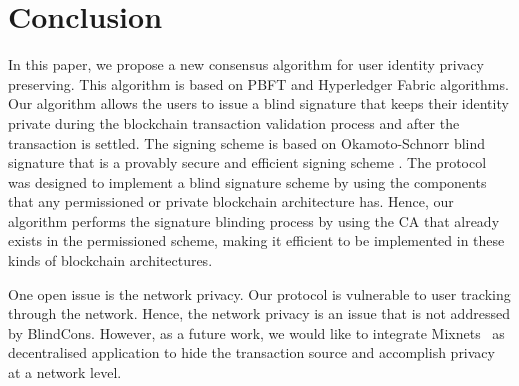 \documentclass[conference]{IEEEtran}
\newcommand{\name}{BlindCons}
\begin{document}
\section{Conclusion} \label{conclu}
In this paper, we propose a new consensus algorithm for user identity privacy preserving. This algorithm is based on PBFT and Hyperledger Fabric algorithms. Our algorithm allows the users to issue a blind signature that keeps their identity private during the blockchain transaction validation process and after the transaction is settled. The signing scheme is based on Okamoto-Schnorr blind signature that is a provably secure \cite{pointcheval1996provably} and efficient signing scheme \cite{schnorr1991efficient}. The protocol was designed to implement a blind signature scheme by using the components that any permissioned or private blockchain architecture has. Hence, our algorithm performs the signature blinding process by using the CA that already exists in the permissioned scheme, making it efficient to be implemented in these kinds of blockchain architectures.

One open issue is the network privacy. Our protocol is vulnerable to user tracking through the network. Hence, the network privacy is an issue that is not addressed by \name{}. However, as a future work, we would like to integrate Mixnets~\cite{Chaum:1981:UEM:358549.358563} as decentralised application to hide the transaction source and accomplish privacy at a network level.



\end{document}
